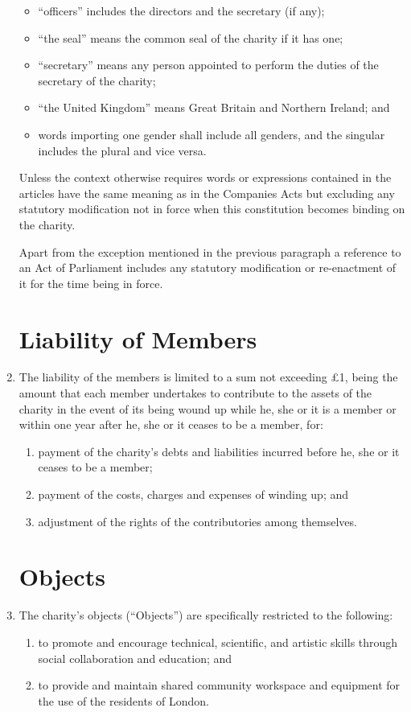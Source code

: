 \begin{enumerate}
\begin{itemize}
  \item
    ``officers'' includes the directors and the secretary (if any);
  \item
    ``the seal'' means the common seal of the charity if it has one;
  \item
    ``secretary'' means any person appointed to perform the duties of
    the secretary of the charity;
  \item
    ``the United Kingdom'' means Great Britain and Northern Ireland;
    and
  \item
    words importing one gender shall include all genders, and the
    singular includes the plural and vice versa.
  \end{itemize}
  Unless the context otherwise requires words or expressions
  contained in the articles have the same meaning as in the Companies
  Acts but excluding any statutory modification not in force when
  this constitution becomes binding on the charity.

  Apart from the exception mentioned in the previous paragraph a
  reference to an Act of Parliament includes any statutory
  modification or re-enactment of it for the time being in force.

\section{Liability of Members}

\item
  The liability of the members is limited to a sum not exceeding £1,
  being the amount that each member undertakes to contribute to the
  assets of the charity in the event of its being wound up while he,
  she or it is a member or within one year after he, she or it ceases
  to be a member, for:
  \begin{enumerate}
  \item
    payment of the charity's debts and liabilities incurred before he,
    she or it ceases to be a member;
  \item
    payment of the costs, charges and expenses of winding up; and
  \item
    adjustment of the rights of the contributories among themselves.
  \end{enumerate}

\section{Objects}

\item
  The charity's objects (``Objects'') are specifically restricted to
  the following:
  \begin{enumerate}
  \item
    to promote and encourage technical, scientific, and artistic skills through social collaboration and education; and
  \item
    to provide and maintain shared community workspace and equipment for the use of the residents of London.
  \end{enumerate}


\end{enumerate}
